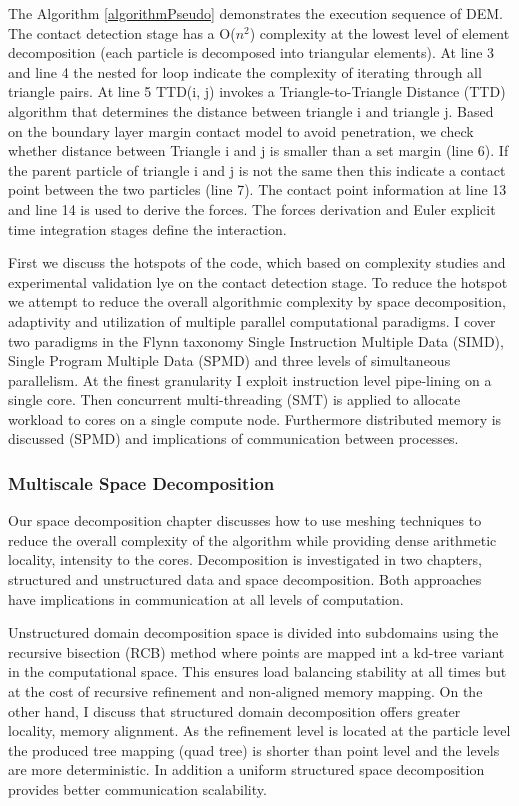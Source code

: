 \documentclass[times,12pt]{article}
\begin{document}
The Algorithm \ref{algorithmPseudo} demonstrates the execution sequence of DEM. The contact detection stage has a O($n^2$) complexity at the lowest level of element decomposition (each particle is decomposed into triangular elements). At line 3 and line 4 the nested for loop indicate the complexity of iterating through all triangle pairs. At line 5 TTD(i, j) invokes a Triangle-to-Triangle Distance (TTD) algorithm that determines the distance between triangle i and triangle j. Based on the boundary layer margin contact model \cite{Krestenitis2015} to avoid penetration, we check whether distance between Triangle i and j is smaller than a set margin (line 6). If the parent particle of triangle i and j is not the same then this indicate a contact point between the two particles (line 7). The contact point information at line 13 and line 14 is used to derive the forces. The forces derivation and Euler explicit time integration stages define the interaction. 

First we discuss the hotspots of the code, which based on complexity studies and experimental validation lye on the contact detection stage. To reduce the hotspot we attempt to reduce the overall algorithmic complexity by space decomposition, adaptivity and utilization of multiple parallel computational paradigms. I cover two paradigms in the Flynn taxonomy Single Instruction Multiple Data (SIMD), Single Program Multiple Data (SPMD) and three levels of simultaneous parallelism. At the finest granularity I exploit instruction level pipe-lining on a single core. Then concurrent multi-threading (SMT) is applied to allocate workload to cores on a single compute node. Furthermore distributed memory is discussed (SPMD) and implications of communication between processes.

\subsubsection{Multiscale Space Decomposition}

Our space decomposition chapter discusses how to use meshing
techniques to reduce the overall complexity of the algorithm while providing dense arithmetic locality, intensity to the cores. Decomposition is investigated in two chapters, structured and unstructured data and space decomposition. Both approaches have implications in communication at all levels of computation. 

Unstructured domain decomposition space is divided into subdomains using the recursive bisection (RCB) method where points are mapped int a kd-tree variant in the computational space. This ensures load balancing stability at all times but at the cost of recursive refinement and non-aligned memory mapping. On the other hand, I discuss that structured domain decomposition offers greater locality, memory alignment. As the refinement level is located at the particle level the produced tree mapping (quad tree) is shorter than point level and the levels are more deterministic. In addition a uniform structured space decomposition provides better communication scalability.  
\end{document}
